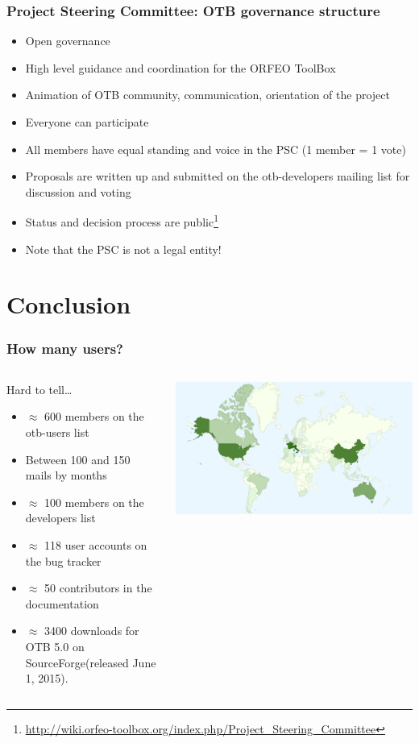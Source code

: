 \documentclass[8pt]{beamer}
\begin{document}
\begin{frame}
\frametitle{Project Steering Committee: OTB governance structure}
\begin{itemize}
\item Open governance
\item High level guidance and coordination for the ORFEO ToolBox
\item Animation of OTB community, communication, orientation of the project
\item Everyone can participate
\item All members have equal standing and voice in the PSC (1 member = 1 vote)
\item Proposals are written up and submitted on the otb-developers mailing list for discussion and voting
\item Status and decision process are
  public\footnote{\url{http://wiki.orfeo-toolbox.org/index.php/Project_Steering_Committee}}
\item Note that the PSC is not a legal entity!
\end{itemize}
\end{frame}


\section{Conclusion}
\begin{frame}
\frametitle{How many users?}
\begin{columns}[c]
\begin{block}{Hard to tell\ldots}
\begin{itemize}
    \item $\approx$ 600 members on the otb-users list
    \item Between 100 and 150 mails by months
    \item $\approx$ 100 members on the developers list
    \item $\approx$ 118 user accounts on the bug tracker
    \item $\approx$ 50 contributors in the documentation
    \item $\approx$ 3400 downloads for OTB 5.0 on SourceForge(released June 1, 2015).
  \end{itemize}
\end{block}
\includegraphics[width=\textwidth]{images/OTB4_download_sourceforge_country_crop.png}
\end{columns}
\end{frame}
\end{document}
